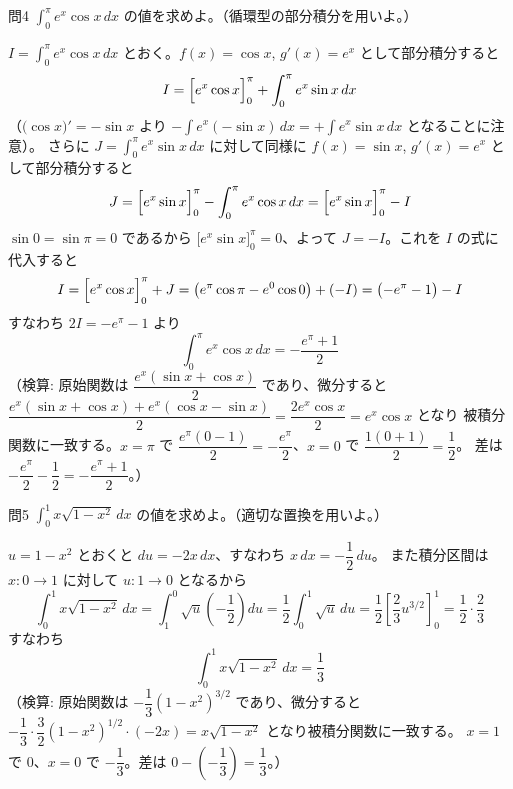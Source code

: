 \documentclass[a4paper,11pt]{article}
\begin{document}
\clearpage
\begin{mondaiboxS}{問4}
$\displaystyle\int_{0}^{\pi} e^{x}\cos x\,dx$ の値を求めよ。（循環型の部分積分を用いよ。）
\end{mondaiboxS}
\kaitou
$I = \displaystyle\int_{0}^{\pi} e^{x}\cos x\,dx$ とおく。$f(x) = \cos x$, $g'(x) = e^{x}$ として部分積分すると
\[
I = \Bigl[e^{x}\cos x\Bigr]_{0}^{\pi} + \int_{0}^{\pi} e^{x}\sin x\,dx
\]
（$\bigl(\cos x\bigr)' = -\sin x$ より $-\int e^x(-\sin x)\,dx = +\int e^x\sin x\,dx$ となることに注意）。
さらに $J = \displaystyle\int_{0}^{\pi} e^{x}\sin x\,dx$ に対して同様に $f(x)=\sin x$, $g'(x)=e^{x}$ として部分積分すると
\[
J = \Bigl[e^{x}\sin x\Bigr]_{0}^{\pi} - \int_{0}^{\pi} e^{x}\cos x\,dx
= \Bigl[e^{x}\sin x\Bigr]_{0}^{\pi} - I
\]
$\sin 0 = \sin\pi = 0$ であるから $\bigl[e^{x}\sin x\bigr]_{0}^{\pi} = 0$、よって $J = -I$。これを $I$ の式に代入すると
\[
I = \Bigl[e^{x}\cos x\Bigr]_{0}^{\pi} + J = \bigl(e^{\pi}\cos\pi - e^{0}\cos 0\bigr) + (-I)
= \bigl(-e^{\pi} - 1\bigr) - I
\]
すなわち $2I = -e^{\pi} - 1$ より
\[
\boxed{\; \int_{0}^{\pi} e^{x}\cos x\,dx = -\frac{e^{\pi}+1}{2} \;}
\]
（検算: 原始関数は $\dfrac{e^{x}(\sin x + \cos x)}{2}$ であり、微分すると
$\dfrac{e^{x}(\sin x+\cos x) + e^{x}(\cos x-\sin x)}{2} = \dfrac{2e^{x}\cos x}{2} = e^{x}\cos x$ となり
被積分関数に一致する。$x=\pi$ で $\dfrac{e^{\pi}(0-1)}{2}=-\dfrac{e^{\pi}}{2}$、$x=0$ で $\dfrac{1(0+1)}{2}=\dfrac12$。
差は $-\dfrac{e^{\pi}}{2}-\dfrac12=-\dfrac{e^{\pi}+1}{2}$。）

\clearpage
\begin{mondaiboxS}{問5}
$\displaystyle\int_{0}^{1} x\sqrt{1-x^{2}}\,dx$ の値を求めよ。（適切な置換を用いよ。）
\end{mondaiboxS}
\kaitou
$u = 1 - x^{2}$ とおくと $du = -2x\,dx$、すなわち $x\,dx = -\dfrac{1}{2}\,du$。
また積分区間は $x: 0\to 1$ に対して $u: 1\to 0$ となるから
\[
\int_{0}^{1} x\sqrt{1-x^{2}}\,dx
= \int_{1}^{0} \sqrt{u}\left(-\frac{1}{2}\right)du
= \frac{1}{2}\int_{0}^{1} \sqrt{u}\,du
= \frac{1}{2}\left[\frac{2}{3}u^{3/2}\right]_{0}^{1}
= \frac{1}{2}\cdot\frac{2}{3}
\]
すなわち
\[
\boxed{\; \int_{0}^{1} x\sqrt{1-x^{2}}\,dx = \frac{1}{3} \;}
\]
（検算: 原始関数は $-\dfrac{1}{3}(1-x^{2})^{3/2}$ であり、微分すると
$-\dfrac{1}{3}\cdot\dfrac{3}{2}(1-x^{2})^{1/2}\cdot(-2x) = x\sqrt{1-x^{2}}$ となり被積分関数に一致する。
$x=1$ で $0$、$x=0$ で $-\dfrac13$。差は $0-\left(-\dfrac13\right)=\dfrac13$。）
\end{document}
